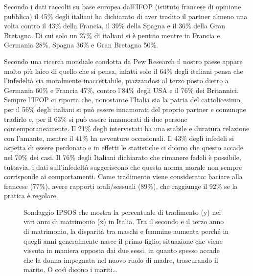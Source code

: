\documentclass[12pt]{book} %
\begin{document}
Secondo i dati raccolti su base europea dall'IFOP (istituto francese di opinione pubblica) il 45\% degli italiani ha dichiarato di
aver tradito il partner almeno una volta contro il 43\% della Francia, il 39\% della Spagna e il 36\% della Gran
Bretagna. Di cui solo un 27\% di italiani si è pentito mentre in Francia e Germania 28\%, Spagna 36\% e Gran Bretagna 50\%. 

Secondo una ricerca mondiale condotta da Pew
Research il nostro paese appare molto più laico di quello che si pensa, infatti solo il 64\% degli italiani pensa che
l'infedeltà sia moralmente inaccettabile, piazzandosi al terzo posto dietro a Germania 60\% e
Francia 47\%, contro l'84\% degli USA e il 76\% dei Britannici. Sempre l'IFOP
ci riporta che, nonostante l'Italia sia la patria del cattolicesimo, per il 56\% degli italiani si
può essere innamorati del proprio partner e comunque tradirlo e, per il 63\% si può essere innamorati di due persone
contemporaneamente. Il 21\% degli intervistati ha una stabile e duratura relazione con l'amante,
mentre il 41\% ha avventure occasionali. Il 43\% degli infedeli si aspetta di essere perdonato e in effetti le
statistiche ci dicono che questo accade nel 70\% dei casi. Il 76\% degli Italiani dichiarato che rimanere fedeli è
possibile, tuttavia, i dati sull’infedeltà suggeriscono che questa norma morale non sempre corrisponde ai comportamenti. Come tradimento viene considerato: baciare alla francese (77\%), avere rapporti orali/sessuali (89\%), che raggiunge il 92\% se la pratica è regolare. 

\needspace{4cm}
\begin{figure}[H]
  \centering
  \caption{Sondaggio IPSOS che mostra la percentuale di tradimento (y) nei vari anni di matrimonio (x) in Italia. Tra il secondo e il terzo anno di matrimonio, la disparità tra maschi e femmine aumenta perché in quegli anni generalmente nasce il primo figlio; situazione che viene vissuta in maniera opposta dai due sessi, in quanto spesso accade che la donna impegnata nel nuovo ruolo di madre, trascurando il marito. O così dicono i mariti…}
\end{figure}
\end{document}

